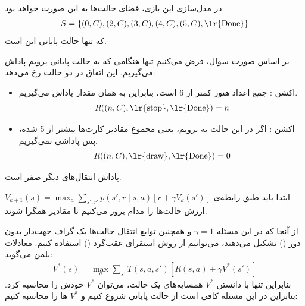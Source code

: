 \question{}

\begin{ابجد}
\item در مدل‌سازی  این بازی، فضای حالت‌ها به این صورت خواهد بود:
\begin{align*}
    S = \{(0,C), (2,C), (3,C), (4,C), (5,C), \text{\lr{Done}}\}
\end{align*}
که  تنها حالت پایانی این  است.

\item بر اساس صورت سوال، فرض می‌کنیم تنها هنگامی که به حالت پایانی برویم پاداش می‌گیریم. این اتفاق در دو حالت رخ می‌دهد:
\begin{itemize}
    \item اکشن : جمع اعداد هنوز کمتر از 6 است، بنابراین به همان مقدار پاداش می‌گیریم.
          \begin{align*}
              R((n, C), \text{\lr{stop}}, \text{\lr{Done}}) = n
          \end{align*}

    \item اکشن : اگر در این حالت به  برویم، یعنی مجموع مقادیر کارت‌ها بیشتر از 5 شده، پس پاداشی نمی‌گیریم.
          \begin{align*}
              R((n, C), \text{\lr{draw}}, \text{\lr{Done}}) = 0
          \end{align*}
\end{itemize}
پاداش انتقال‌های دیگر صفر است.

\item ابتدا باید طبق رابطه‌ی $V_{k+1}(s) = \max_a \sum_{s', r'} p(s', r \mid s,a) [r + \gamma V_k(s')]$ ارزش حالت‌ها را مدام بروز می‌کنیم تا مقادیر همگرا شوند.

از آنجا که در این مسئله $\gamma = 1$ و همچنین توابع انتقال حالت‌ها یک گراف جهت‌دار بدون دور () تشکیل می‌دهند، می‌توانیم از روش استقرای عقب‌گرد () استفاده کنیم. معادلات بلمن می‌گوید:
\begin{align*}
    V^*(s) = \max_a \sum_{s'} T(s, a, s') \left[ R(s,a) + \gamma V^*(s') \right]
\end{align*}
بنابراین تنها با دانستن $V^*$ همسایه‌های یک حالت، می‌توان $V^*$ خودش را محاسبه کرد. بنابراین در این مسئله کافی است از حالت پایانی شروع کنیم و $V^*$ ها را محاسبه کنیم:


\end{ابجد}
